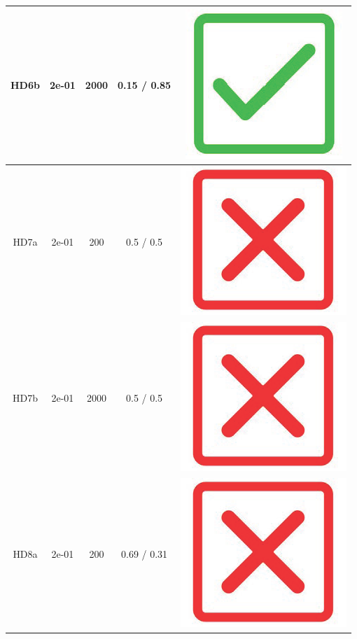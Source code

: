 \begin{table}[!h]
{\begin{tabular}[t]{ccccc}
\midrule
HD6b & 2e-01 & 2000 & 0.15 / 0.85 & \includegraphics[scale=0.05]{figs/green_tick.png}\\
\midrule
HD7a & 2e-01 & 200 & 0.5 / 0.5 & \includegraphics[scale=0.05]{figs/red_cross.png}\\
\midrule
HD7b & 2e-01 & 2000 & 0.5 / 0.5 & \includegraphics[scale=0.05]{figs/red_cross.png}\\
\midrule
HD8a & 2e-01 & 200 & 0.69 / 0.31 & \includegraphics[scale=0.05]{figs/red_cross.png}\\

\end{tabular}}
\end{table}
